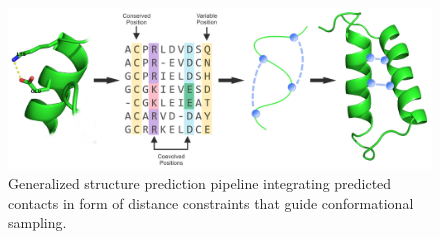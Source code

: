\documentclass[11pt,a4paper,twoside]{book}
\theoremstyle{definition}
\theoremstyle{definition}
\theoremstyle{remark}
\begin{document}
\begin{figure}

{\centering \includegraphics[width=1\linewidth]{img/intro/contact_assisted_structure_prediction} 

}

\caption{Generalized
structure prediction pipeline integrating predicted contacts in form of
distance constraints that guide conformational sampling.}\label{fig:contact-assisted-structure-prediction}
\end{figure}
\end{document}
